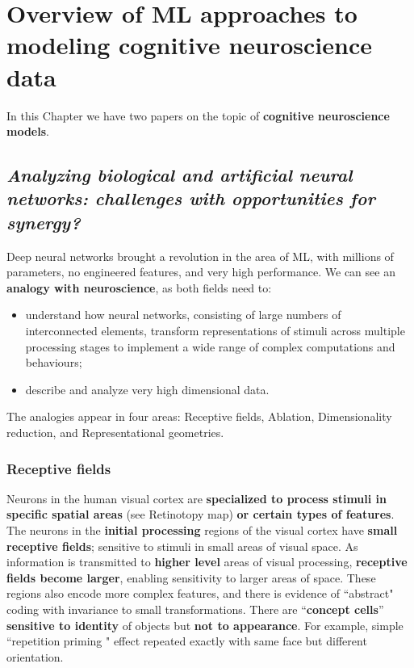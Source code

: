 \chapter{Overview of ML approaches to modeling cognitive neuroscience data}
\label{chap:overview}

In this Chapter we have two papers on the topic of \textbf{cognitive neuroscience models}.

\section[Analyzing biological and artificial neural networks]{\textit{Analyzing biological and artificial neural networks: challenges with opportunities for synergy?}\\ }

Deep neural networks brought a revolution in the area of ML, with millions of parameters, no engineered features, and very high performance. We can see an \textbf{analogy with neuroscience}, as both fields need to:
\begin{itemize}
    \item understand how neural networks, consisting of large numbers of interconnected elements, transform representations of stimuli across multiple processing stages to implement a wide range of complex computations and behaviours;
    \item describe and analyze very high dimensional data.
\end{itemize}

The analogies appear in four areas: Receptive fields, Ablation, Dimensionality reduction, and Representational geometries.

\subsection{Receptive fields}
Neurons in the human visual cortex are \textbf{specialized to process stimuli in specific spatial areas} (see \notedv Retinotopy map) \textbf{or certain types of features}.
The neurons in the \textbf{initial processing} regions of the visual cortex have \textbf{small receptive fields}; sensitive to stimuli in small areas of visual space.
As information is transmitted to \textbf{higher level} areas of visual processing, \textbf{receptive fields become larger}, enabling sensitivity to larger areas of space. These regions also encode more complex features, and there is evidence of ``abstract" coding with invariance to small transformations. There are ``\textbf{concept cells}” \textbf{sensitive to identity} of objects but \textbf{not to appearance}. For example, simple ``repetition priming \notet" effect repeated exactly with same face but different orientation.

